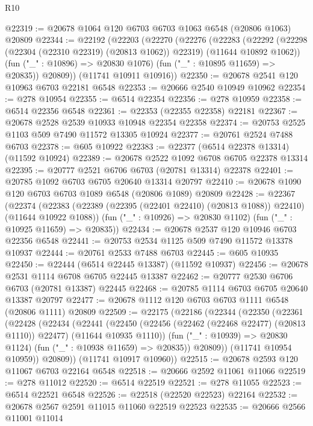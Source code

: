 \begin{lexlean}{R10}
\begin{coremodule}
{{{{{{{{{{{{{{{{{{{{{{{{{{{{{{{{{{{{{{{{{{{{{{{{{{{{{{{{{{{{{{{{{{{{{{{{{{{{{{{{{{{{@22319 := @20678 @1064 @120 @6703 @6703 @1063 @6548 (@20806 @1063) @20809
@22344 := @22192
    (@22203
      (@22270
        (@22276
          (@22283
            (@22292 (@22298 (@22304 (@22310 @22319) (@20813 @1062)) @22319) (@11644 @10892 @1062))
            (fun ("_" : @10896) => @20830 @1076)
            (fun ("_" : @10895 @11659) => @20835))
          @20809))
      (@11741 @10911 @10916))
@22350 := @20678 @2541 @120 @10963 @6703 @22181 @6548
@22353 := @20666 @2540 @10949 @10962
@22354 := @278 @10954
@22355 := @6514 @22354
@22356 := @278 @10959
@22358 := @6514 @22356 @6548
@22361 := @22353 (@22355 @22358) @22181
@22367 := @20678 @2528 @2539 @10933 @10948 @22354 @22358
@22374 := @20753 @2525 @1103 @509 @7490 @11572 @13305 @10924
@22377 := @20761 @2524 @7488 @6703
@22378 := @605 @10922
@22383 := @22377 (@6514 @22378 @13314) (@11592 @10924)
@22389 := @20678 @2522 @1092 @6708 @6705 @22378 @13314
@22395 := @20777 @2521 @6706 @6703 (@20781 @13314) @22378
@22401 := @20785 @1092 @6703 @6705 @20640 @13314 @20797
@22410 := @20678 @1090 @120 @6703 @6703 @1089 @6548 (@20806 @1089) @20809
@22428 := @22367
    (@22374
      (@22383 (@22389 (@22395 (@22401 @22410) (@20813 @1088)) @22410) (@11644 @10922 @1088))
      (fun ("_" : @10926) => @20830 @1102)
      (fun ("_" : @10925 @11659) => @20835))
@22434 := @20678 @2537 @120 @10946 @6703 @22356 @6548
@22441 := @20753 @2534 @1125 @509 @7490 @11572 @13378 @10937
@22444 := @20761 @2533 @7488 @6703
@22445 := @605 @10935
@22450 := @22444 (@6514 @22445 @13387) (@11592 @10937)
@22456 := @20678 @2531 @1114 @6708 @6705 @22445 @13387
@22462 := @20777 @2530 @6706 @6703 (@20781 @13387) @22445
@22468 := @20785 @1114 @6703 @6705 @20640 @13387 @20797
@22477 := @20678 @1112 @120 @6703 @6703 @1111 @6548 (@20806 @1111) @20809
@22509 := @22175
    (@22186
      (@22344
        (@22350
          (@22361
            (@22428
              (@22434
                (@22441
                  (@22450
                    (@22456 (@22462 (@22468 @22477) (@20813 @1110)) @22477)
                    (@11644 @10935 @1110))
                  (fun ("_" : @10939) => @20830 @1124)
                  (fun ("_" : @10938 @11659) => @20835))
                @20809))
            (@11741 @10954 @10959))
          @20809))
      (@11741 @10917 @10960))
@22515 := @20678 @2593 @120 @11067 @6703 @22164 @6548
@22518 := @20666 @2592 @11061 @11066
@22519 := @278 @11012
@22520 := @6514 @22519
@22521 := @278 @11055
@22523 := @6514 @22521 @6548
@22526 := @22518 (@22520 @22523) @22164
@22532 := @20678 @2567 @2591 @11015 @11060 @22519 @22523
@22535 := @20666 @2566 @11001 @11014
}}}}}}}}}}}}}}}}}}}}}}}}}}}}}}}}}}}}}}}}}}}}}}}}}}}}}}}}}}}}}}}}}}}}}}}}}}}}}}}}}}}}
\end{coremodule}
\end{lexlean}
